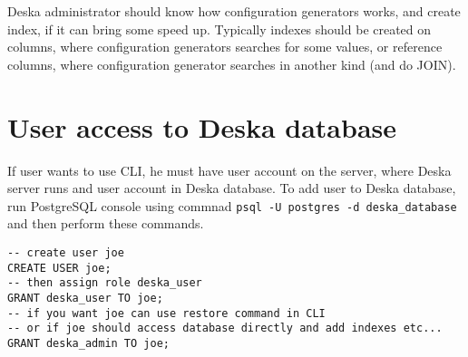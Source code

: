 \documentclass[deska]{subfiles}
\begin{document}
Deska administrator should know how configuration generators works, and create index, if
it can bring some speed up. Typically indexes should be created on columns, where 
configuration generators searches for some values, or reference columns, where configuration generator
searches in another kind (and do JOIN).

\section{User access to Deska database}
If user wants to use CLI, he must have user account on the server, where Deska server runs and 
user account in Deska database.
To add user to Deska database, run PostgreSQL console using commnad {\tt psql -U postgres -d deska\_database}
and then perform these commands.
\begin{verbatim}
-- create user joe
CREATE USER joe;
-- then assign role deska_user
GRANT deska_user TO joe;
-- if you want joe can use restore command in CLI
-- or if joe should access database directly and add indexes etc...
GRANT deska_admin TO joe;
\end{verbatim}
\end{document}
